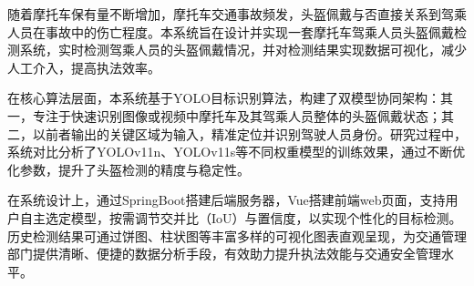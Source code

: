 随着摩托车保有量不断增加，摩托车交通事故频发，头盔佩戴与否直接关系到驾乘人员在事故中的伤亡程度。本系统旨在设计并实现一套摩托车驾乘人员头盔佩戴检测系统，实时检测驾乘人员的头盔佩戴情况，并对检测结果实现数据可视化，减少人工介入，提高执法效率。

在核心算法层面，本系统基于YOLO目标识别算法，构建了双模型协同架构：其一，专注于快速识别图像或视频中摩托车及其驾乘人员整体的头盔佩戴状态；其二，以前者输出的关键区域为输入，精准定位并识别驾驶人员身份。研究过程中，系统对比分析了YOLOv11n、YOLOv11s等不同权重模型的训练效果，通过不断优化参数，提升了头盔检测的精度与稳定性。

在系统设计上，通过SpringBoot搭建后端服务器，Vue搭建前端web页面，支持用户自主选定模型，按需调节交并比（IoU）与置信度，以实现个性化的目标检测。历史检测结果可通过饼图、柱状图等丰富多样的可视化图表直观呈现，为交通管理部门提供清晰、便捷的数据分析手段，有效助力提升执法效能与交通安全管理水平。